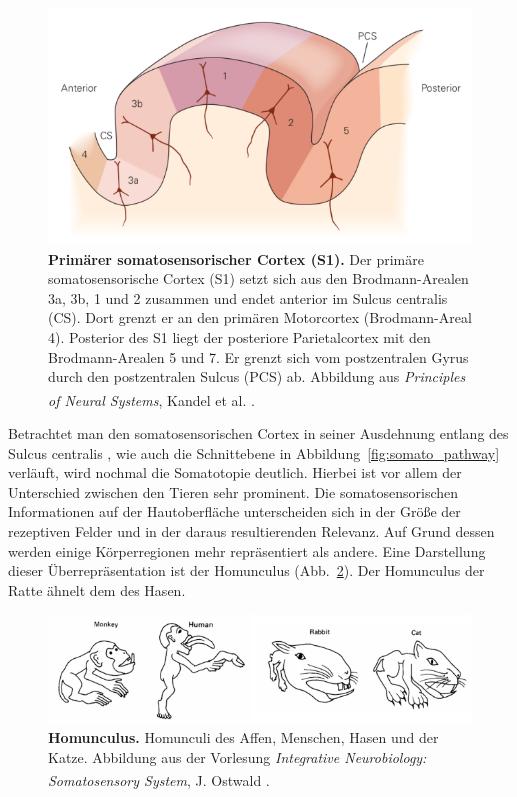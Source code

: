 \documentclass[12pt,a4paper,pdftex]{article}
\begin{document}
\begin{figure}[H]
    \centering
    \includegraphics{pictures/somatosensory/S1_Cortex.png}
    \caption[Primärer somatosensorischer Cortex]{\textbf{Primärer somatosensorischer Cortex (S1).} Der primäre somatosensorische Cortex (S1) setzt sich aus den Brodmann-Arealen 3a, 3b, 1 und 2 zusammen und endet anterior im Sulcus centralis (CS). Dort grenzt er an den primären Motorcortex (Brodmann-Areal 4). Posterior des S1 liegt der posteriore Parietalcortex mit den Brodmann-Arealen 5 und 7. Er grenzt sich vom postzentralen Gyrus durch den postzentralen Sulcus (PCS) ab. Abbildung aus \textit{Principles of Neural Systems}, Kandel et al. \textsuperscript{\cite[23]{kandel2013principles}}.}
    \label{fig:S1_Cortex}
\end{figure}

Betrachtet man den somatosensorischen Cortex in seiner Ausdehnung entlang des Sulcus centralis , wie auch die Schnittebene in Abbildung~\ref{fig:somato_pathway} verläuft, wird nochmal die Somatotopie  deutlich. Hierbei ist vor allem der Unterschied zwischen den Tieren sehr prominent. Die somatosensorischen Informationen auf der Hautoberfläche unterscheiden sich in der Größe der rezeptiven Felder und in der daraus resultierenden Relevanz. Auf Grund dessen werden einige Körperregionen mehr repräsentiert als andere. Eine Darstellung dieser Überrepräsentation ist der Homunculus (Abb.~\ref{fig:somato_homunculus}). Der Homunculus  der Ratte ähnelt dem des Hasen.


\begin{figure}[H]
    \centering
    \includegraphics[width = \textwidth] {pictures/somatosensory/homunculus.png}
    \caption[Homunculus]{\textbf{Homunculus.} Homunculi des Affen, Menschen, Hasen und der Katze. Abbildung aus der Vorlesung \textit{Integrative Neurobiology: Somatosensory System}, J. Ostwald \textsuperscript{\cite{Ostwald}}.}
    \label{fig:somato_homunculus}
\end{figure}
\end{document}
